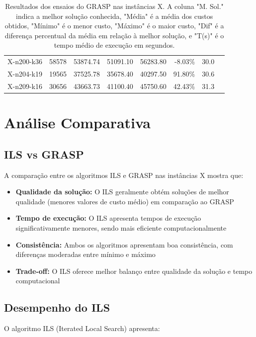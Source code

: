 \documentclass[12pt,a4paper]{article}
\begin{document}
\begin{table}[htbp]
\begin{tabular}{@{}lrrrrrrr@{}}
    X-n200-k36 & 58578 & 53874.74 & 51091.10 & 56283.80 & -8.03\% & 30.0 \\
    X-n204-k19 & 19565 & 37525.78 & 35678.40 & 40297.50 & 91.80\% & 30.6 \\
    X-n209-k16 & 30656 & 43663.73 & 41100.40 & 45750.60 & 42.43\% & 31.3 \\
\bottomrule
\end{tabular}
\caption{Resultados dos ensaios do GRASP nas instâncias X. A coluna "M. Sol." indica a melhor solução conhecida, "Média" é a média dos custos obtidos, "Mínimo" é o menor custo, "Máximo" é o maior custo, "Dif" é a diferença percentual da média em relação à melhor solução, e "T(s)" é o tempo médio de execução em segundos.}
\label{tab:grasp_results}
\end{table}

\clearpage

\section{Análise Comparativa}

\subsection{ILS vs GRASP}

A comparação entre os algoritmos ILS e GRASP nas instâncias X mostra que:

\begin{itemize}
    \item \textbf{Qualidade da solução:} O ILS geralmente obtém soluções de melhor qualidade (menores valores de custo médio) em comparação ao GRASP
    \item \textbf{Tempo de execução:} O ILS apresenta tempos de execução significativamente menores, sendo mais eficiente computacionalmente
    \item \textbf{Consistência:} Ambos os algoritmos apresentam boa consistência, com diferenças moderadas entre mínimo e máximo
    \item \textbf{Trade-off:} O ILS oferece melhor balanço entre qualidade da solução e tempo computacional
\end{itemize}

\subsection{Desempenho do ILS}

O algoritmo ILS (Iterated Local Search) apresenta:
\end{document}
